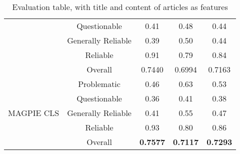 \begin{table}[htbp]
\begin{tabular}{| c | c | c | c | c |}
                                                          & Questionable       & 0.41               & 0.48            & 0.44            \\
                                                          & Generally Reliable & 0.39               & 0.50            & 0.44            \\
                                                          & Reliable           & 0.91               & 0.79            & 0.84            \\\cline{2-5}
                                                          & Overall            & 0.7440             & 0.6994          & 0.7163          \\
        \hline
        \multirow{5}{*}{MAGPIE CLS}                       & Problematic        & 0.46               & 0.63            & 0.53            \\
                                                          & Questionable       & 0.36               & 0.41            & 0.38            \\
                                                          & Generally Reliable & 0.41               & 0.55            & 0.47            \\
                                                          & Reliable           & 0.93               & 0.80            & 0.86            \\\cline{2-5}
                                                          & Overall            & \textbf{0.7577}    & \textbf{0.7117} & \textbf{0.7293} \\
        \hline
    \end{tabular}
    \caption{Evaluation table, with title and content of articles as features}
    \label{table:eval}
\end{table}

